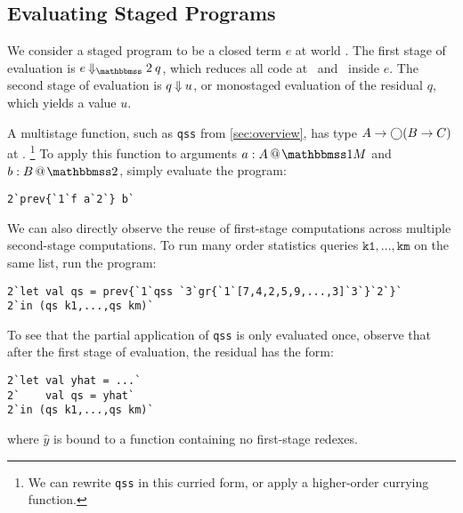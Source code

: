

\subsection{Evaluating Staged Programs}

We consider a staged program to be a closed term $e$ at world \bbtwo. The first
stage of evaluation is $e\mathbin{\redtwosym} q$, which reduces all code at
\bbonem\ and \bbonep\ inside $e$. The second stage of evaluation is $q
\mathbin{{\Downarrow}} u$, or monostaged evaluation of the residual $q$, which yields
a value $u$.

A multistage function, such as \texttt{qss} from \ref{sec:overview}, has
type $A\to \bigcirc (B \to C)$ at \bbonem.%
\footnote{We can rewrite \texttt{qss} in this curried form, or apply a
higher-order currying function.}
To apply this function to arguments $\colmix a A$ and $\coltwo b B$, simply
evaluate the program:
\begin{lstlisting}
2`prev{`1`f a`2`} b`
\end{lstlisting}

We can also directly observe the reuse of first-stage computations across
multiple second-stage computations. To run many order statistics queries
$\texttt{k1},\dots,\texttt{km}$ on the same list, run the program:
\begin{lstlisting}
2`let val qs = prev{`1`qss `3`gr{`1`[7,4,2,5,9,...,3]`3`}`2`}`
2`in (qs k1,...,qs km)`
\end{lstlisting}
To see that the partial application of \texttt{qss} is only evaluated once,
observe that after the first stage of evaluation, the residual has the form:
\begin{lstlisting}
2`let val yhat = ...`
2`    val qs = yhat`
2`in (qs k1,...,qs km)`
\end{lstlisting}
where $\hat{y}$ is bound to a function containing no first-stage redexes.
